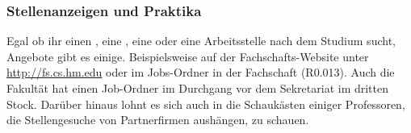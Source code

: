 \subsubsection{Stellenanzeigen und Praktika}
Egal ob ihr einen , eine , 
eine  oder eine Arbeitsstelle nach dem 
Studium sucht, Angebote gibt es einige. Beispielsweise auf der 
Fachschafts-Website unter \url{http://fs.cs.hm.edu} \arrow {} oder im 
Jobs-Ordner in der Fachschaft (R0.013). Auch die Fakultät hat einen Job-Ordner im Durchgang vor dem Sekretariat im dritten Stock. Darüber 
hinaus lohnt es sich auch in die Schaukästen einiger Professoren, die 
Stellengesuche von Partnerfirmen aushängen, zu schauen. 